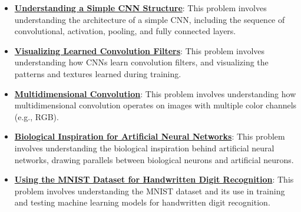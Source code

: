 \documentclass{article}%
\begin{document}
\begin{itemize}[leftmargin=*]
\item \href{https://purdue.brightspace.com/d2l/common/assets/pdfjs-d2l-dist/1.0.14-legacy/web/viewer.html?file=\%2Fcontent\%2Fenforced\%2F1095467-wl.202510.CS.24300.001\%2F09L1-cnn.pdf\%3Fou\%3D1095467\&lang=en-us\&container=d2l-fileviewer-rendered-pdf\&fullscreen=d2l-fileviewer-rendered-pdf-dialog\&height=667#page=17}{\textbf{Understanding a Simple CNN Structure}}: This problem involves understanding the architecture of a simple CNN, including the sequence of convolutional, activation, pooling, and fully connected layers.%
\item \href{https://purdue.brightspace.com/d2l/common/assets/pdfjs-d2l-dist/1.0.14-legacy/web/viewer.html?file=\%2Fcontent\%2Fenforced\%2F1095467-wl.202510.CS.24300.001\%2F09L1-cnn.pdf\%3Fou\%3D1095467\&lang=en-us\&container=d2l-fileviewer-rendered-pdf\&fullscreen=d2l-fileviewer-rendered-pdf-dialog\&height=667#page=18}{\textbf{Visualizing Learned Convolution Filters}}: This problem involves understanding how CNNs learn convolution filters, and visualizing the patterns and textures learned during training.%
\item \href{https://purdue.brightspace.com/d2l/common/assets/pdfjs-d2l-dist/1.0.14-legacy/web/viewer.html?file=\%2Fcontent\%2Fenforced\%2F1095467-wl.202510.CS.24300.001\%2F09L1-cnn.pdf\%3Fou\%3D1095467\&lang=en-us\&container=d2l-fileviewer-rendered-pdf\&fullscreen=d2l-fileviewer-rendered-pdf-dialog\&height=667#page=19}{\textbf{Multidimensional Convolution}}: This problem involves understanding how multidimensional convolution operates on images with multiple color channels (e.g., RGB).%
\item \href{https://purdue.brightspace.com/d2l/common/assets/pdfjs-d2l-dist/1.0.14-legacy/web/viewer.html?file=\%2Fcontent\%2Fenforced\%2F1095467-wl.202510.CS.24300.001\%2F09L1-cnn.pdf\%3Fou\%3D1095467\&lang=en-us\&container=d2l-fileviewer-rendered-pdf\&fullscreen=d2l-fileviewer-rendered-pdf-dialog\&height=667#page=20}{\textbf{Biological Inspiration for Artificial Neural Networks}}: This problem involves understanding the biological inspiration behind artificial neural networks, drawing parallels between biological neurons and artificial neurons.%
\item \href{https://purdue.brightspace.com/d2l/common/assets/pdfjs-d2l-dist/1.0.14-legacy/web/viewer.html?file=\%2Fcontent\%2Fenforced\%2F1095467-wl.202510.CS.24300.001\%2F09L1-cnn.pdf\%3Fou\%3D1095467\&lang=en-us\&container=d2l-fileviewer-rendered-pdf\&fullscreen=d2l-fileviewer-rendered-pdf-dialog\&height=667#page=21}{\textbf{Using the MNIST Dataset for Handwritten Digit Recognition}}: This problem involves understanding the MNIST dataset and its use in training and testing machine learning models for handwritten digit recognition.%

\end{itemize}
\end{document}
